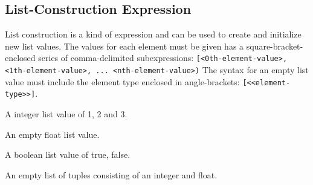 
\subsection{List-Construction Expression}
{
	List construction is a kind of expression and can be
	used to create and initialize new list values.
	The values for each element must be given has a square-bracket-enclosed
	series of comma-delimited
	subexpressions: \texttt{[<0th-element-value>, <1th-element-value>, ... <nth-element-value>)}
	The syntax for an empty list value must include the element type enclosed
	in angle-brackets: \texttt{[<<element-type>>]}.
	
	\begin{itemize}
	{
		\item[\texttt{[1, 2, 3]}] A integer list value of 1, 2 and 3.
		
		\item[\texttt{[<float>]}] An empty float list value.
		
		\item[\texttt{[true, false]}] A boolean list value of true, false.
		
		\item[\texttt{[<(int, float)>]}] An empty list of tuples consisting
			of an integer and float.
	}
	\end{itemize}
}
